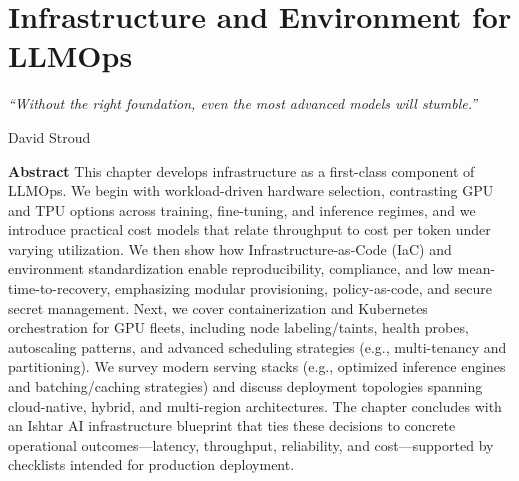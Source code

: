 \chapter{Infrastructure and Environment for LLMOps}
\label{ch:infra}
\newrefsegment


\epigraph{\emph{``Without the right foundation, even the most advanced models will stumble.''}}{David Stroud}

\textbf{Abstract} This chapter develops infrastructure as a first-class component of LLMOps. We begin with workload-driven hardware selection, contrasting GPU and TPU options across training, fine-tuning, and inference regimes, and we introduce practical cost models that relate throughput to cost per token under varying utilization. We then show how Infrastructure-as-Code (IaC) and environment standardization enable reproducibility, compliance, and low mean-time-to-recovery, emphasizing modular provisioning, policy-as-code, and secure secret management. Next, we cover containerization and Kubernetes orchestration for GPU fleets, including node labeling/taints, health probes, autoscaling patterns, and advanced scheduling strategies (e.g., multi-tenancy and partitioning). We survey modern serving stacks (e.g., optimized inference engines and batching/caching strategies) and discuss deployment topologies spanning cloud-native, hybrid, and multi-region architectures. The chapter concludes with an Ishtar AI infrastructure blueprint that ties these decisions to concrete operational outcomes—latency, throughput, reliability, and cost—supported by checklists intended for production deployment.

